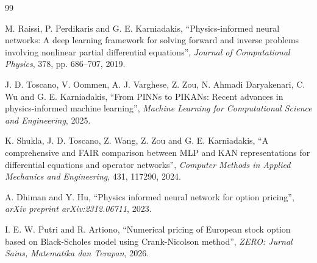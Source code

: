 \documentclass[11pt,a4paper]{article}
\begin{document}
\begin{thebibliography}{99}

M. Raissi, P. Perdikaris and G. E. Karniadakis,
``Physics-informed neural networks: A deep learning framework for solving forward and inverse problems involving nonlinear partial differential equations'',
\textit{Journal of Computational Physics}, 378, pp. 686--707, 2019.

J. D. Toscano, V. Oommen, A. J. Varghese, Z. Zou, N. Ahmadi Daryakenari, C. Wu and G. E. Karniadakis,
``From PINNs to PIKANs: Recent advances in physics-informed machine learning'',
\textit{Machine Learning for Computational Science and Engineering}, 2025.

K. Shukla, J. D. Toscano, Z. Wang, Z. Zou and G. E. Karniadakis,
``A comprehensive and FAIR comparison between MLP and KAN representations for differential equations and operator networks'',
\textit{Computer Methods in Applied Mechanics and Engineering}, 431, 117290, 2024.

A. Dhiman and Y. Hu,
``Physics informed neural network for option pricing'',
\textit{arXiv preprint arXiv:2312.06711}, 2023.

I. E. W. Putri and R. Artiono,
``Numerical pricing of European stock option based on Black-Scholes model using Crank-Nicolson method'',
\textit{ZERO: Jurnal Sains, Matematika dan Terapan}, 2026.

\end{thebibliography}
\end{document}
